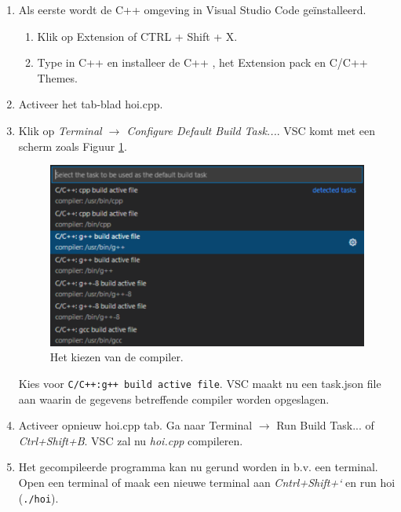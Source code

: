 \begin{enumerate}
     \begin{enumerate}
     	\item  Als eerste wordt de C++ omgeving in Visual Studio Code geïnstalleerd.
     	\begin{enumerate}
     		\item Klik op Extension  of CTRL + Shift + X.
     		\item Type in C++ en installeer de C++  , het Extension pack en C/C++ Themes.
        \end{enumerate}
     	\item Activeer het tab-blad hoi.cpp.
     	\item Klik op \textit{Terminal $\rightarrow$ Configure Default Build Task...}. VSC komt met een scherm zoals Figuur \ref{fig:vscComp}.
\begin{figure}[h!]
	\captionsetup{justification=centering}
	\includegraphics[width=0.6 \linewidth]{figuren/VSCcompile}
	\centering
	\caption{Het kiezen van de compiler.}
	\label{fig:vscComp}
\end{figure}     	
Kies voor \texttt{C/C++:g++ build active file}.
VSC maakt nu een task.json file aan waarin de gegevens betreffende compiler worden opgeslagen.
\item Activeer opnieuw hoi.cpp tab. Ga naar Terminal $\rightarrow$ Run Build Task... of \textit{Ctrl+Shift+B}. VSC zal nu \textit{hoi.cpp} compileren.

\item Het gecompileerde programma kan nu gerund worden in b.v. een terminal. Open een terminal of maak een nieuwe terminal aan \textit{Cntrl+Shift+`} en run hoi (\texttt{./hoi}).
\end{enumerate}
     

\end{enumerate}
